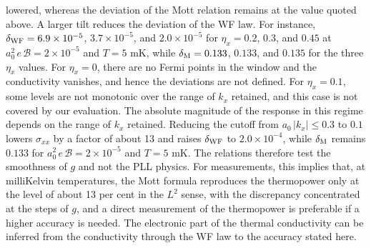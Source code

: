 \documentclass[aps,prb, onecolumn, nofootinbib, citeautoscript,10pt]{revtex4-2}
\begin{document}
lowered, whereas the deviation of the Mott relation remains at the value quoted above. A larger tilt reduces the deviation of the WF law. For instance, $\delta_{\rm WF}=6.9\times10^{-5}$, $3.7\times10^{-5}$, and $2.0\times10^{-5}$ for $\eta_x=0.2$, $0.3$, and $0.45$ at $a_0^2\,e\,\mathcal B=2\times10^{-5}$ and $T=5$ mK, while $\delta_{\rm M}=0.133$, $0.133$, and $0.135$ for the three $\eta_x$ values. For $\eta_x=0$, there are no Fermi points in the window and the conductivity vanishes, and hence the deviations are not defined. For $\eta_x=0.1$, some levels are not monotonic over the range of $k_x$ retained, and this case is not covered by our evaluation. The absolute magnitude of the response in this regime depends on the range of $k_x$ retained. Reducing the cutoff from $a_0\,|k_x|\le0.3$ to $0.1$ lowers $\sigma_{xx}$ by a factor of about 13 and raises $\delta_{\rm WF}$ to $2.0\times10^{-4}$, while $\delta_{\rm M}$ remains $0.133$ for $a_0^2\,e\,\mathcal B=2\times10^{-5}$ and $T=5$ mK. The relations therefore test the smoothness of $g$ and not the PLL physics. For measurements, this implies that, at milliKelvin temperatures, the Mott formula reproduces the thermopower only at the level of about 13 per cent in the $L^2$ sense, with the discrepancy concentrated at the steps of $g$, and a direct measurement of the thermopower is preferable if a higher accuracy is needed. The electronic part of the thermal conductivity can be inferred from the conductivity through the WF law to the accuracy stated here.
\end{document}
